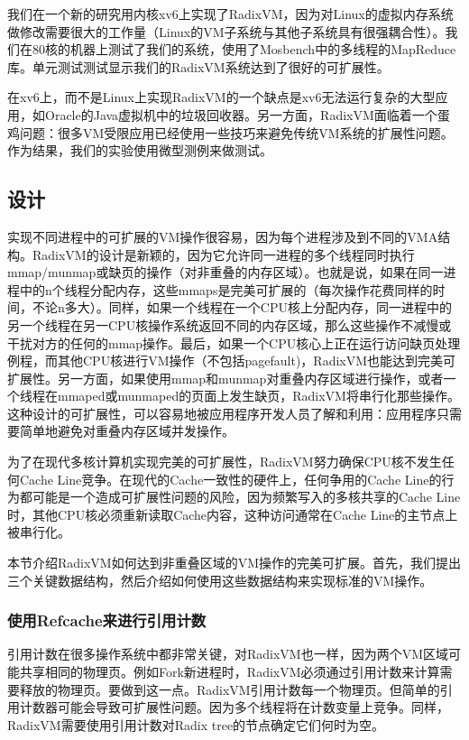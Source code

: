 我们在一个新的研究用内核xv6上实现了RadixVM，因为对Linux的虚拟内存系统做修改需要很大的工作量（Linux的VM子系统与其他子系统具有很强耦合性）。我们在80核的机器上测试了我们的系统，使用了Mosbench中的多线程的MapReduce库。单元测试测试显示我们的RadixVM系统达到了很好的可扩展性。

在xv6上，而不是Linux上实现RadixVM的一个缺点是xv6无法运行复杂的大型应用，如Oracle的Java虚拟机中的垃圾回收器。另一方面，RadixVM面临着一个蛋鸡问题：很多VM受限应用已经使用一些技巧来避免传统VM系统的扩展性问题。作为结果，我们的实验使用微型测例来做测试。


\subsection{设计}
实现不同进程中的可扩展的VM操作很容易，因为每个进程涉及到不同的VMA结构。RadixVM的设计是新颖的，因为它允许同一进程的多个线程同时执行mmap/munmap或缺页的操作（对非重叠的内存区域）。也就是说，如果在同一进程中的n个线程分配内存，这些mmaps是完美可扩展的（每次操作花费同样的时间，不论n多大）。同样，如果一个线程在一个CPU核上分配内存，同一进程中的另一个线程在另一CPU核操作系统返回不同的内存区域，那么这些操作不减慢或干扰对方的任何的mmap操作。最后，如果一个CPU核心上正在运行访问缺页处理例程，而其他CPU核进行VM操作（不包括pagefault)，RadixVM也能达到完美可扩展性。另一方面，如果使用mmap和munmap对重叠内存区域进行操作，或者一个线程在mmaped或munmaped的页面上发生缺页，RadixVM将串行化那些操作。这种设计的可扩展性，可以容易地被应用程序开发人员了解和利用：应用程序只需要简单地避免对重叠内存区域并发操作。

为了在现代多核计算机实现完美的可扩展性，RadixVM努力确保CPU核不发生任何Cache
Line竞争。在现代的Cache一致性的硬件上，任何争用的Cache
Line的行为都可能是一个造成可扩展性问题的风险，因为频繁写入的多核共享的Cache
Line时，其他CPU核必须重新读取Cache内容，这种访问通常在Cache
Line的主节点上被串行化。

本节介绍RadixVM如何达到非重叠区域的VM操作的完美可扩展。首先，我们提出三个关键数据结构，然后介绍如何使用这些数据结构来实现标准的VM操作。

\subsubsection{使用Refcache来进行引用计数}
引用计数在很多操作系统中都非常关键，对RadixVM也一样，因为两个VM区域可能共享相同的物理页。例如Fork新进程时，RadixVM必须通过引用计数来计算需要释放的物理页。要做到这一点。RadixVM引用计数每一个物理页。但简单的引用计数器可能会导致可扩展性问题。因为多个线程将在计数变量上竞争。同样，RadixVM需要使用引用计数对Radix
tree的节点确定它们何时为空。

